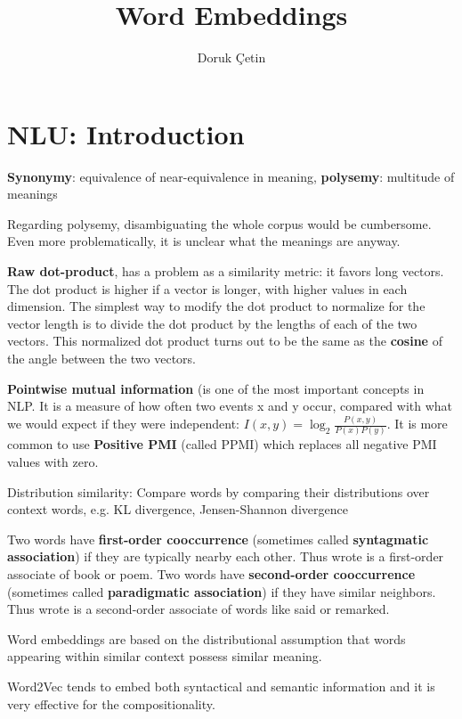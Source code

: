 \documentclass[12pt]{article}
\begin{document}
\rhead{\today}

\title{Word Embeddings}
\author{Doruk Çetin}


\section{NLU: Introduction}
\par \textbf{Synonymy}: equivalence of near-equivalence in meaning, \textbf{polysemy}: multitude of meanings
\par Regarding polysemy, disambiguating the whole corpus would be cumbersome. Even more problematically, it is unclear what the meanings are anyway.
\par \textbf{Raw dot-product}, has a problem as a similarity metric: it favors long vectors. The dot product is higher if a vector is longer, with higher values in each dimension. The simplest way to modify the dot product to normalize for the vector length is to divide the dot product by the lengths of each of the two vectors. This normalized dot product turns out to be the same as the \textbf{cosine} of the angle between the two vectors.
\par \textbf{Pointwise mutual information} (is one of the most important concepts in NLP. It is a measure of how often two events x and y occur, compared with what we would expect if they were independent:
$I(x,y) = \log_2 \frac{P(x,y)}{P(x)P(y)}$. It is more common to use \textbf{Positive PMI} (called PPMI) which replaces all negative PMI values with zero.
\par Distribution similarity: Compare words by comparing their distributions over context words, e.g. KL divergence, Jensen-Shannon divergence
\par Two words have \textbf{first-order cooccurrence} (sometimes called \textbf{syntagmatic association}) if they are typically nearby each other. Thus wrote is a first-order associate of book or poem. Two words have \textbf{second-order cooccurrence} (sometimes called \textbf{paradigmatic association}) if they have similar neighbors. Thus wrote is a second-order associate of words like said or remarked.
\par Word embeddings are based on the distributional assumption that words appearing within similar context possess similar meaning.
\par Word2Vec tends to embed both syntactical and semantic information and it is very effective for the compositionality.
\end{document}
